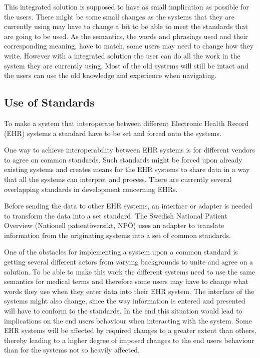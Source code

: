 \documentclass[14pt]{article}
\begin{document}
This integrated solution is supposed to have as small implication as possible for the users. There might be some small changes as the systems that they are currently using may have to change a bit to be able to meet the standards that are going to be used. As the semantics, the words and phrasings used and their corresponding meaning, have to match, some users may need to change how they write. However with a integrated solution the user can do all the work in the system they are currently using. Most of the old systems will still be intact and the users can use the old knowledge and experience when navigating.

\subsection{Use of Standards} %
\label{sec:resultsStandards}
To make a system that interoperate between different Electronic Health Record (EHR) systems a standard have to be set and forced onto the systems. 

One way to achieve interoperability between EHR systems is for different vendors to agree on common standards. Such standards might be forced upon already existing systems and creates means for the EHR systems to share data in a way that all the systems can interpret and process. There are currently several overlapping standards in development concerning EHRs.

Before sending the data to other EHR systems, an interface or adapter is needed to transform the data into a set standard. The Swedish National Patient Overview (Nationell patientöversikt, NPÖ) uses an adapter to translate information from the originating systems into a set of common standards. 

One of the obstacles for implementing a system upon a common standard is getting several different actors from varying backgrounds to unite and agree on a solution. To be able to make this work the different systems need to use the same semantics for medical terms and therefore some users may have to change what words they use when they enter data into their EHR system. The interface of the systems might also change, since the way information is entered and presented will have to conform to the standards. In the end this situation would lead to implications on the end users behaviour when interacting with the system. Some EHR systems will be affected by required changes to a greater extent than others, thereby leading to a higher degree of imposed changes to the end users behaviour than for the systems not so heavily affected.
\end{document}
